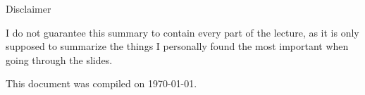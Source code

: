 \newpage
\begin{center}
    Disclaimer
\end{center}

\noindent
I do not guarantee this summary to contain every part of the lecture, as it is only supposed to summarize the things I personally found the most important when going through the slides.

\begin{center}
 This document was compiled on \today.
\end{center}
\newpage
